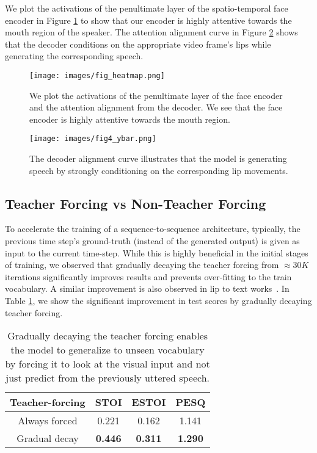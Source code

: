 \documentclass[10pt,twocolumn,letterpaper]{article}
\begin{document}
We plot the activations of the penultimate layer of the spatio-temporal face encoder in Figure \ref{fig:heatmap} to show that our encoder is highly attentive towards the mouth region of the speaker. The attention alignment curve in Figure \ref{fig:alignment} shows that the decoder conditions on the appropriate video frame's lips while generating the corresponding speech.

\begin{figure}[h]
  \texttt{[image: images/fig\_heatmap.png]}
  \caption{We plot the activations of the penultimate layer of the face encoder and the attention alignment from the decoder. We see that the face encoder is highly attentive towards the mouth region.}
  \label{fig:heatmap}
\end{figure}

\begin{figure}[h]
  \texttt{[image: images/fig4\_ybar.png]}
  \caption{The decoder alignment curve illustrates that the model is generating speech by strongly conditioning on the corresponding lip movements.}
  \label{fig:alignment}
\end{figure}

\subsection{Teacher Forcing vs Non-Teacher Forcing}
\label{subsection:teacherforcing}
To accelerate the training of a sequence-to-sequence architecture, typically, the previous time step's ground-truth (instead of the generated output) is given as input to the current time-step. While this is highly beneficial in the initial stages of training, we observed that gradually decaying the teacher forcing from $\approx 30K$ iterations significantly improves results and prevents over-fitting to the train vocabulary. A similar improvement is also observed in lip to text works~\cite{Afouras2018DeepLR}. In Table \ref{tab:teacherforcing}, we show the significant improvement in test scores by gradually decaying teacher forcing.

\begin{table}[h]
\centering
  \begin{tabular}{|c||c|c|c|}
    \hline
    Teacher-forcing & STOI & ESTOI & PESQ \\
    \hline
    Always forced & 0.221 & 0.162 & 1.141\\
    Gradual decay & \textbf{0.446} & \textbf{0.311} & \textbf{1.290} \\
  \hline
\end{tabular}
    \vspace{.2cm}
    \caption{Gradually decaying the teacher forcing enables the model to generalize to unseen vocabulary by forcing it to look at the visual input and not just predict from the previously uttered speech.}
    \label{tab:teacherforcing}
\end{table}
\end{document}
